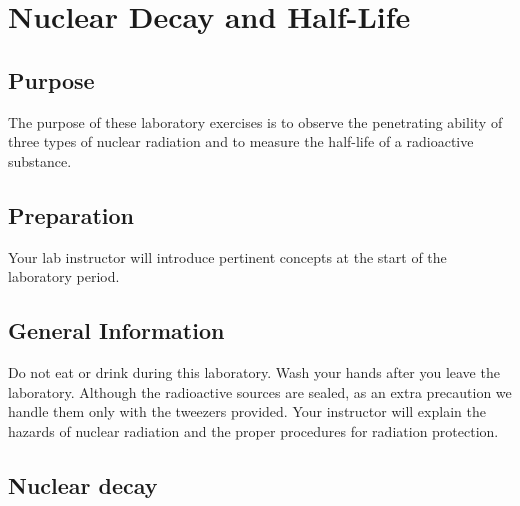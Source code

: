 \chapter {Nuclear Decay and Half-Life}

\section {Purpose} The purpose of these laboratory exercises is to observe the penetrating ability of three types of nuclear radiation and to measure the half-life of a radioactive substance.

\section {Preparation} Your lab instructor will introduce pertinent concepts at the start of the laboratory period.

\section {General Information}
Do not eat or drink during this laboratory. Wash your hands after you leave the laboratory. Although the radioactive sources are sealed, as an extra precaution we handle them only with the tweezers provided. Your instructor will explain the hazards of nuclear radiation and the proper procedures for radiation protection.

\section {Nuclear decay}

